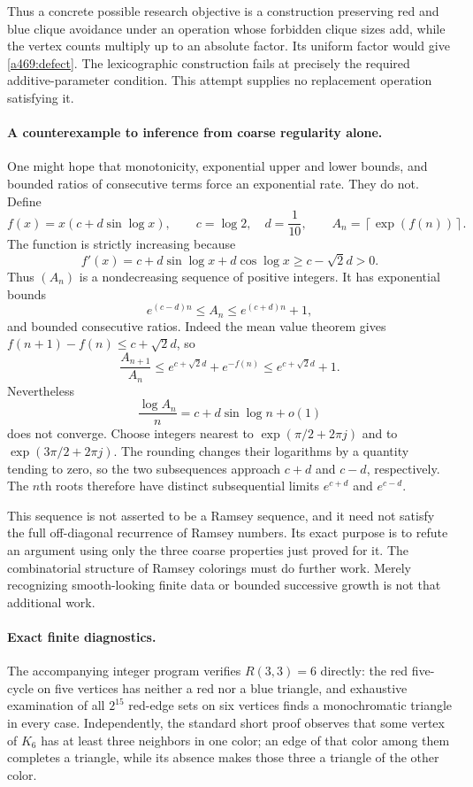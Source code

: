 \documentclass[11pt]{article}
\begin{document}
Thus a concrete possible research objective is a construction preserving red and blue clique avoidance under an operation whose forbidden clique sizes add, while the vertex counts multiply up to an absolute factor. Its uniform factor would give \eqref{a469:defect}. The lexicographic construction fails at precisely the required additive-parameter condition. This attempt supplies no replacement operation satisfying it.

\paragraph{A counterexample to inference from coarse regularity alone.}
One might hope that monotonicity, exponential upper and lower bounds, and bounded ratios of consecutive terms force an exponential rate. They do not. Define
\[
 f(x)=x\left(c+d\sin\log x\right),\qquad
 c=\log2,\quad d=\frac1{10},\qquad
 A_n=\left\lceil\exp(f(n))\right\rceil.
\]
The function is strictly increasing because
\[
 f'(x)=c+d\sin\log x+d\cos\log x\geq c-\sqrt2d>0.
\]
Thus $(A_n)$ is a nondecreasing sequence of positive integers. It has exponential bounds
\[
 e^{(c-d)n}\leq A_n\leq e^{(c+d)n}+1,
\]
and bounded consecutive ratios. Indeed the mean value theorem gives $f(n+1)-f(n)\leq c+\sqrt2d$, so
\[
 \frac{A_{n+1}}{A_n}
       \leq e^{c+\sqrt2d}+e^{-f(n)}
       \leq e^{c+\sqrt2d}+1.
\]
Nevertheless
\[
                         \frac{\log A_n}{n}
                       =c+d\sin\log n+o(1)
\]
does not converge. Choose integers nearest to $\exp(\pi/2+2\pi j)$ and to $\exp(3\pi/2+2\pi j)$. The rounding changes their logarithms by a quantity tending to zero, so the two subsequences approach $c+d$ and $c-d$, respectively. The $n$th roots therefore have distinct subsequential limits $e^{c+d}$ and $e^{c-d}$.

This sequence is not asserted to be a Ramsey sequence, and it need not satisfy the full off-diagonal recurrence of Ramsey numbers. Its exact purpose is to refute an argument using only the three coarse properties just proved for it. The combinatorial structure of Ramsey colorings must do further work. Merely recognizing smooth-looking finite data or bounded successive growth is not that additional work.

\paragraph{Exact finite diagnostics.}
The accompanying integer program verifies $R(3,3)=6$ directly: the red five-cycle on five vertices has neither a red nor a blue triangle, and exhaustive examination of all $2^{15}$ red-edge sets on six vertices finds a monochromatic triangle in every case. Independently, the standard short proof observes that some vertex of $K_6$ has at least three neighbors in one color; an edge of that color among them completes a triangle, while its absence makes those three a triangle of the other color.
\end{document}
